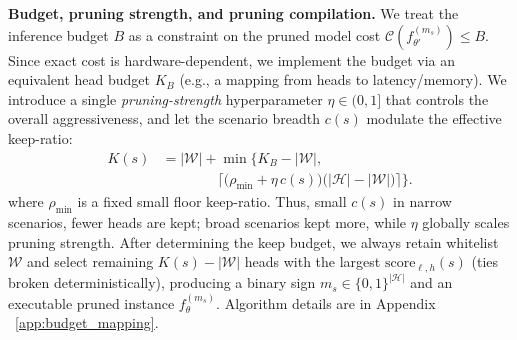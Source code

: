 \textbf{Budget, pruning strength, and pruning compilation.}
We treat the inference budget $B$ as a constraint on the pruned model cost $\mathcal{C}\left(f_{\theta'}^{\left(m_s\right)}\right) \le B$.
Since exact cost is hardware-dependent, we implement the budget via an equivalent head budget $K_B$ (e.g., a mapping from heads to latency/memory).
We introduce a single \emph{pruning-strength} hyperparameter $\eta \in (0, 1]$ that controls the overall aggressiveness, and let the scenario breadth $c(s)$ modulate the effective keep-ratio:
{\small
\begin{equation}
\label{eq:on:Ks}
\begin{split}
K(s)
&= |\mathcal{W}|
 + \min\Big\{
   K_B-|\mathcal{W}|,\,
\\
&\qquad\qquad
   \Big\lceil\big(\rho_{\min}+\eta\,c(s)\big)\big(|\mathcal{H}|-|\mathcal{W}|\big)\Big\rceil
 \Big\}.
\end{split}
\end{equation}
}
\vspace{-0.5mm}
where $\rho_{\min}$ is a fixed small floor keep-ratio.
Thus, small $c(s)$ in narrow scenarios, fewer heads are kept; broad scenarios kept more, while $\eta$ globally scales pruning strength. After determining the keep budget, we always retain whitelist $\mathcal{W}$ and select remaining $K(s) - |\mathcal{W}|$ heads with the largest $\mathrm{score}_{\ell,h}(s)$ (ties broken deterministically), producing a binary sign $m_s \in \{0, 1\}^{|\mathcal{H}|}$ and an executable pruned instance $f_{\theta}^{(m_s)}$. Algorithm details are in Appendix ~\ref{app:budget_mapping}.
\vspace{-0.5mm}
